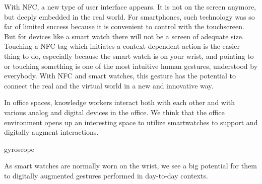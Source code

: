 \documentclass{article}
\begin{document}
With NFC, a new type of user interface appears. It is not on the screen anymore, but deeply embedded in the real world. For smartphones, such technology was so far of limited success because it is convenient to control with the touchscreen. But for devices like a smart watch there will not be a screen of adequate size. Touching a NFC tag which initiates a context-dependent action is the easier thing to do, especially because the smart watch is on your wrist, and pointing to or touching something is one of the most intuitive human gestures, understood by everybody. With NFC and smart watches, this gesture has the potential to connect the real and the virtual world in a new and innovative way.

In office spaces, knowledge workers interact both with
each other and with various analog and digital devices
in the office. We think that the office environment
opens up an interesting space to utilize smartwatches
to support and digitally augment interactions.

gyroscope

 As smart watches are
normally worn on the wrist, we see a big potential for
them to digitally augmented gestures performed in
day-to-day contexts.
\end{document}
